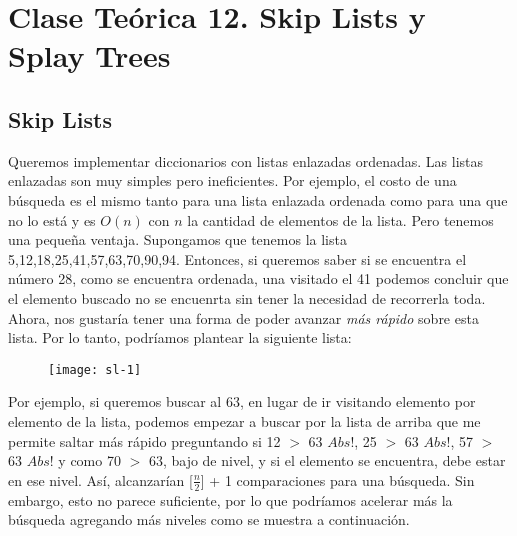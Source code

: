 \documentclass[10pt,a4paper]{article}
\begin{document}
\section{Clase Teórica 12. Skip Lists y Splay Trees}

\subsection{Skip Lists}

Queremos implementar diccionarios con listas enlazadas ordenadas.
\newline
\newline
Las listas enlazadas son muy simples pero ineficientes. Por ejemplo, el costo de una búsqueda es el mismo tanto para una lista enlazada ordenada como para una que no lo está y es $O(n)$ con $n$ la cantidad de elementos de la lista. 
\newline
\newline
Pero tenemos una pequeña ventaja. Supongamos que tenemos la lista 5,12,18,25,41,57,63,70,90,94. Entonces, si queremos saber si se encuentra el número 28, como se encuentra ordenada, una visitado el 41 podemos concluir que el elemento buscado no se encuenrta sin tener la necesidad de recorrerla toda.
\newline
\newline
Ahora, nos gustaría tener una forma de poder avanzar \textit{más rápido} sobre esta lista. Por lo tanto, podríamos plantear la siguiente lista:
\newline
\newline
\begin{figure}[h]
	\centering
\texttt{[image: sl-1]}
	\label{drivers1}
\end{figure}      
\newline
\newline
Por ejemplo, si queremos buscar al 63, en lugar de ir visitando elemento por elemento de la lista, podemos empezar a buscar por la lista de arriba que me permite saltar más rápido preguntando si 12 $>$ 63 $Abs!$, 25 $>$ 63 $Abs!$, 57 $>$ 63 $Abs!$ y como 70 $>$ 63, bajo de nivel, y si el elemento se encuentra, debe estar en ese nivel. 
\newline
\newline
Así, alcanzarían [$\displaystyle \frac{n}{2}$] + 1 comparaciones para una búsqueda. 
\newline
\newline
Sin embargo, esto no parece suficiente, por lo que podríamos acelerar más la búsqueda agregando más niveles como se muestra a continuación. 
\end{document}
